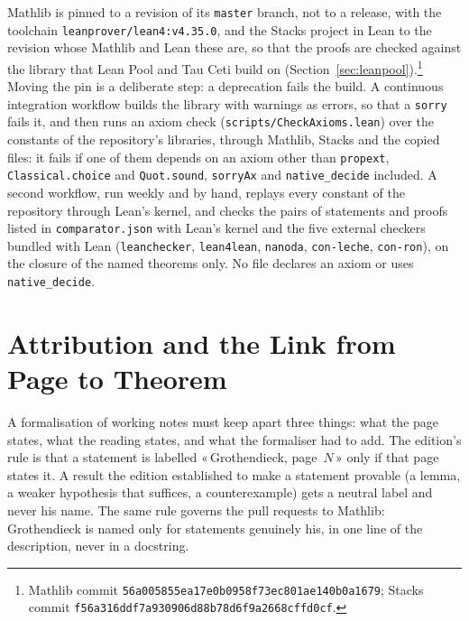 \documentclass[runningheads,a4paper]{llncs}
\newcommand{\q}[1]{«\,#1\,»}
\newcommand{\lean}[1]{\texttt{#1}}
\begin{document}
Mathlib is pinned to a revision of its \texttt{master} branch, not to a release, with the toolchain \texttt{leanprover/lean4:v4.35.0}, and the Stacks project in Lean \cite{stacksaxiom} to the revision whose Mathlib and Lean these are, so that the proofs are checked against the library that Lean Pool and Tau Ceti build on (Section~\ref{sec:leanpool}).\footnote{Mathlib commit \nolinkurl{56a005855ea17e0b0958f73ec801ae140b0a1679}; Stacks commit \nolinkurl{f56a316ddf7a930906d88b78d6f9a2668cffd0cf}.} Moving the pin is a deliberate step: a deprecation fails the build. A continuous integration workflow builds the library with warnings as errors, so that a \lean{sorry} fails it, and then runs an axiom check (\texttt{scripts/CheckAxioms.lean}) over the constants of the repository's libraries, through Mathlib, Stacks and the copied files: it fails if one of them depends on an axiom other than \lean{propext}, \lean{Classical.choice} and \lean{Quot.sound}, \lean{sorryAx} and \lean{native\_decide} included. A second workflow, run weekly and by hand, replays every constant of the repository through Lean's kernel, and checks the pairs of statements and proofs listed in \texttt{comparator.json} with Lean's kernel and the five external checkers bundled with Lean (\texttt{leanchecker}, \texttt{lean4lean}, \texttt{nanoda}, \texttt{con-leche}, \texttt{con-ron}), on the closure of the named theorems only. No file declares an axiom or uses \lean{native\_decide}.

\section{Attribution and the Link from Page to Theorem}\label{sec:attribution}

A formalisation of working notes must keep apart three things: what the page states, what the reading states, and what the formaliser had to add. The edition's rule is that a statement is labelled \q{Grothendieck, page~$N$} only if that page states it. A result the edition established to make a statement provable (a lemma, a weaker hypothesis that suffices, a counterexample) gets a neutral label and never his name. The same rule governs the pull requests to Mathlib: Grothendieck is named only for statements genuinely his, in one line of the description, never in a docstring.
\end{document}
